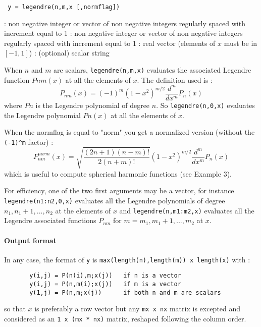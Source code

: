 
\begin{mandesc}
\end{mandesc}

\begin{calling_sequence}
\begin{verbatim}
 y = legendre(n,m,x [,normflag]) 
\end{verbatim}
\end{calling_sequence}

\begin{parameters}
  \begin{varlist}
   : non negative integer or vector of non negative integers regularly spaced with increment equal to 1
   : non negative integer or vector of non negative integers regularly spaced with increment equal to 1
   : real vector (elements of $x$ must be in $[-1,1]$)
   : (optional) scalar string
  \end{varlist}
\end{parameters}

\begin{mandescription}
  When $n$ and $m$ are scalars, \verb!legendre(n,m,x)! evaluates the associated Legendre 
  function $Pnm(x)$ at all the elements of $x$. The definition used is :
$$  
P_{nm}(x) = (-1)^m \left(1 - x^2 \right)^{m/2} \frac{d^m}{dx^m} P_n (x)
$$
where $Pn$ is the Legendre polynomial of degree $n$. So 
\verb!legendre(n,0,x)! evaluates the Legendre polynomial $Pn(x)$ at all 
the elements of $x$. 
  
When the normflag is equal to "norm" you get a normalized version (without
the \verb!(-1)^m! factor) :
$$
 P_{nm}^{norm}(x) = \sqrt{\frac{(2n+1) (n-m)!}{2 (n+m)!}} \left(1 - x^2 \right)^{m/2} \frac{d^m}{dx^m} P_n (x)
$$
which is useful to compute spherical harmonic functions (see Example 3).
  
For efficiency, one of the two first arguments may be a vector, for instance
\verb!legendre(n1:n2,0,x)! evaluates all the Legendre polynomials of
degree $n_1, n_1+1, ..., n_2$ at the elements of $x$ and
\verb!legendre(n,m1:m2,x)! evaluates all the Legendre associated 
functions $P_{nm}$ for $m=m_1, m_1+1, ..., m_2$ at $x$.

\paragraph{Output format}

In any case, the format of \verb!y! is \verb+max(length(n),length(m)) x length(x)+
with :
\begin{verbatim}
       y(i,j) = P(n(i),m;x(j))   if n is a vector
       y(i,j) = P(n,m(i);x(j))   if m is a vector
       y(1,j) = P(n,m;x(j))      if both n and m are scalars
\end{verbatim}
so that $x$ is preferably a row vector but any \texttt{mx x nx} matrix
is excepted and considered as an \texttt{1 x (mx * nx)} matrix, reshaped
following the column order.
  
\end{mandescription}

